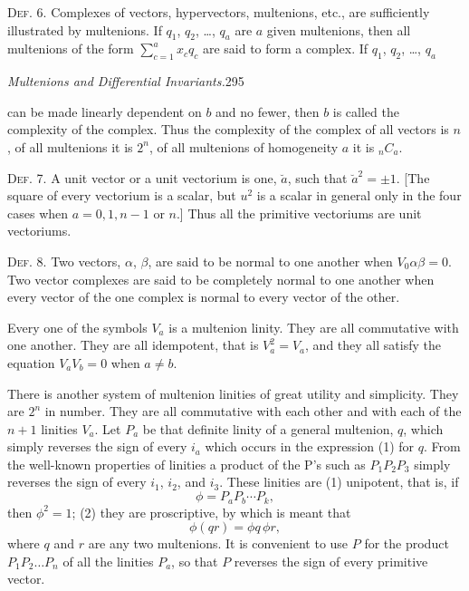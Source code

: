 \documentclass[11pt]{article}
\begin{document}
\noindent\textsc{Def. 6.} Complexes of vectors, hypervectors, multenions,
etc., are sufficiently illustrated by multenions. If $q_1$, $q_2$, \ldots,
$q_a$ are $a$ given multenions, then all multenions of the form
$\sum_{c=1}^{a}x_cq_c$ are said to form a complex. If $q_1$, $q_2$, \ldots,
$q_a$

\newpage\thispagestyle{empty}
\begin{center}\textit{Multenions and Differential Invariants.}\hfill 295\end{center}
can be made linearly dependent on $b$ and no fewer, then $b$ is called the complexity of the complex. Thus the complexity of the complex of all vectors is $n$, of all multenions it is $2^n$, of all multenions of homogeneity $a$ it is ${}_nC_a$.

\noindent\textsc{Def. 7.} A unit vector or a unit vectorium is one, $\breve a$, such that $\breve a^2=\pm1$. [The square of every vectorium is a scalar, but $u^2$ is a scalar in general only in the four cases when $a=0,1,n-1$ or $n$.] Thus all the primitive vectoriums are unit vectoriums.

\noindent\textsc{Def. 8.} Two vectors, $\alpha$, $\beta$, are said to be normal to one another when $V_0\alpha\beta=0$. Two vector complexes are said to be completely normal to one another when every vector of the one complex is normal to every vector of the other.

\indent Every one of the symbols $V_a$ is a multenion linity. They are all commutative with one another. They are all idempotent, that is $V_a^2=V_a$, and they all satisfy the equation $V_aV_b=0$ when $a\ne b$.

\indent There is another system of multenion linities of great utility and simplicity. They are $2^n$ in number. They are all commutative with each other and with each of the $n+1$ linities $V_a$. Let $P_a$ be that definite linity of a general multenion, $q$, which simply reverses the sign of every $i_a$ which occurs in the expression (1) for $q$. From the well-known properties of linities a product of the P's such as $P_1P_2P_3$ simply reverses the sign of every $i_1$, $i_2$, and $i_3$. These linities are (1) unipotent, that is, if
\begin{equation}\phi=P_aP_b\cdots P_k,\tag{3}\end{equation}
then $\phi^2=1$; (2) they are proscriptive, by which is meant that
\begin{equation}\phi(qr)=\phi q\,\phi r,\tag{4}\end{equation}
where $q$ and $r$ are any two multenions. It is convenient to use $P$ for the product $P_1P_2\ldots P_n$ of all the linities $P_a$, so that $P$ reverses the sign of every primitive vector.
\end{document}
